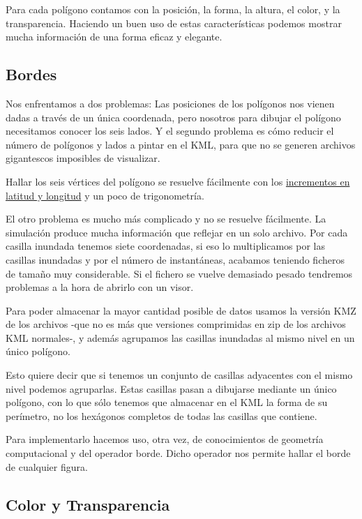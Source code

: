 Para cada polígono contamos con la posición, la forma, la altura, el color, y la
transparencia. Haciendo un buen uso de estas características podemos mostrar
mucha información de una forma eficaz y elegante.

\subsection*{Bordes}

Nos enfrentamos a dos problemas: Las posiciones de los polígonos nos vienen
dadas a través de un única coordenada, pero nosotros para dibujar el polígono
necesitamos conocer los seis lados. Y el segundo problema es cómo reducir el
número de polígonos y lados a pintar en el KML, para que no se generen archivos
gigantescos imposibles de visualizar.

Hallar los seis vértices del polígono se resuelve fácilmente con los
\hyperref[incrementos]{incrementos en latitud y longitud} y un poco de
trigonometría.

El otro problema es mucho más complicado y no se resuelve fácilmente. La
simulación produce mucha información que reflejar en un solo archivo. Por
cada casilla inundada tenemos siete coordenadas, si eso lo multiplicamos por las
casillas inundadas y por el número de instantáneas, acabamos teniendo ficheros
de tamaño muy considerable. Si el fichero se vuelve demasiado pesado tendremos
problemas a la hora de abrirlo con un visor.

Para poder almacenar la mayor cantidad posible de datos usamos la versión KMZ
de los archivos -que no es más que versiones comprimidas en zip de los
archivos KML normales-, y además agrupamos las casillas inundadas al mismo
nivel en un único polígono.

Esto quiere decir que si tenemos un conjunto de casillas adyacentes con el
mismo nivel podemos agruparlas. Estas casillas pasan a dibujarse mediante un
único polígono, con lo que sólo tenemos que almacenar en el KML la forma de su
perímetro, no los hexágonos completos de todas las casillas que contiene.

Para implementarlo hacemos uso, otra vez, de conocimientos de geometría
computacional y del operador borde. Dicho operador nos permite hallar el
borde de cualquier figura.



\subsection*{Color y Transparencia}


